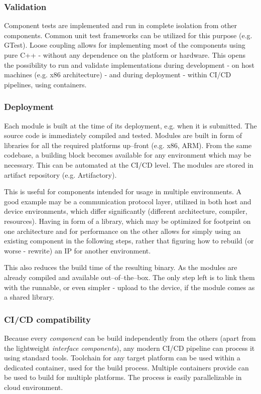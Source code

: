 \documentclass[preprint,12pt, a4paper]{elsarticle}
\begin{document}
\subsubsection{Validation}
Component tests are implemented and run in complete isolation from other components. Common unit test frameworks can be utilized for this purpose (e.g. GTest). Loose coupling allows for implementing most of the components using pure C++ - without any dependence on the platform or hardware. This opens the possibility to run and validate implementations during development - on host machines (e.g. x86 architecture) - and during deployment - within CI/CD pipelines, using containers.

\subsubsection{Deployment}
Each module is built at the time of its deployment, e.g. when it is submitted. The source code is immediately compiled and tested. Modules are built in form of libraries for all the required platforms up--front (e.g. x86, ARM). From the same codebase, a building block becomes available for any environment which may be necessary. This can be automated at the CI/CD level. The modules are stored in artifact repository (e.g. Artifactory).

This is useful for components intended for usage in multiple environments. A good example may be a communication protocol layer, utilized in both host and device environments, which differ significantly (different architecture, compiler, resources). Having in form of a library, which may be optimized for footprint on one architecture and for performance on the other allows for simply using an existing component in the following steps, rather that figuring how to rebuild (or worse - rewrite) an IP for another environment.

This also reduces the build time of the resulting binary. As the modules are already compiled and available out--of--the--box. The only step left is to link them with the runnable, or even simpler - upload to the device, if the module comes as a shared library.

\subsubsection{CI/CD compatibility}
Because every \textit{component} can be build independently from the others (apart from the lightweight \textit{interface components}), any modern CI/CD pipeline can process it using standard tools. Toolchain for any target platform can be used within a dedicated container, used for the build process. Multiple containers provide can be used to build for multiple platforms. The process is easily parallelizable in cloud environment.
\end{document}
